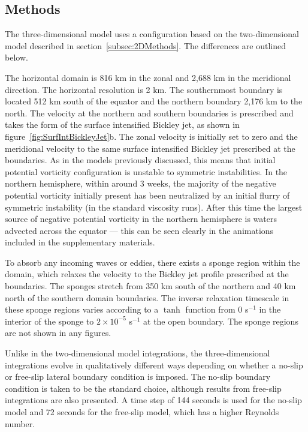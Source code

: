     \subsection{Methods}
    The three-dimensional model uses a configuration based on the two-dimensional model described in section~\ref{subsec:2DMethods}. The differences are outlined below.

    The horizontal domain is 816 km in the zonal and 2,688 km in the meridional direction. The horizontal resolution is 2 km. The southernmost boundary is located 512 km south of the equator and the northern boundary 2,176 km to the north. The velocity at the northern and southern boundaries is prescribed and takes the form of the surface intensified Bickley jet, as shown in figure~\ref{fig:SurfIntBickleyJet}b. The zonal velocity is initially set to zero and the meridional velocity to the same  surface intensified Bickley jet prescribed at the boundaries. As in the models previously discussed, this means that initial potential vorticity configuration is unstable to symmetric instabilities. In the northern hemisphere, within around 3 weeks, the majority of the negative potential vorticity initially present has been neutralized by an initial flurry of symmetric instability (in the standard viscosity runs). After this time the largest source of negative potential vorticity in the northern hemisphere is waters advected across the equator --- this can be seen clearly in the animations included in the supplementary materials.
    
    To absorb any incoming waves or eddies, there exists a sponge region within the  domain, which relaxes the velocity to the Bickley jet profile prescribed at the boundaries. The sponges stretch from 350 km south of the northern and 40 km north of the southern domain boundaries. The inverse relaxation timescale in these sponge regions varies according to a $\tanh$ function from 0 s$^{-1}$ in the interior of the sponge to $2 \times 10^{-5}$ s$^{-1}$ at the open boundary. The sponge regions are not shown in any figures.

    Unlike in the two-dimensional model integrations, the three-dimensional integrations evolve in qualitatively different ways depending on whether a no-slip or free-slip lateral boundary condition is imposed. The no-slip boundary condition is taken to be the standard choice, although results from free-slip integrations are also presented. A time step of 144 seconds is used for the no-slip model and 72 seconds for the free-slip model, which has a higher Reynolds number.

